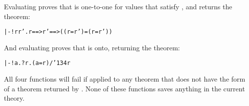 \noindent Evaluating  proves that 
is one-to-one for values that satisfy , and returns the theorem:

{\def\bk{\char'134}
\begin{hol}\begin{alltt}
   |- !r r'.  r ==>  r' ==> (( r =  r') = (r = r'))
\end{alltt}\end{hol}}

\noindent And evaluating  proves that 
is onto, returning the theorem:

{\def\bk{\char'134}
\begin{hol}
\begin{alltt}
   |- !a. ?r. (a =  r) /\bk {} r
\end{alltt}
\end{hol}}

\noindent All four functions will fail if applied to any theorem that does not
have the form of a theorem returned by .
None of these functions saves anything in the current theory.



